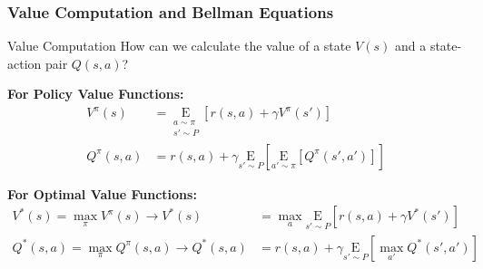 \begin{frame}
  \frametitle{Value Computation and Bellman Equations}

  \begin{block}{Value Computation}
    How can we calculate the value of a state $V(s)$ 
    and a state-action pair $Q(s,a)$?
  \end{block}


  \textbf{For Policy Value Functions:}
  \begin{align*}
      V^{\pi}(s) &= \underset{\substack{a \sim \pi \\ s'\sim P}}{\mathrm{E}} 
      \left[ r(s,a) + \gamma V^{\pi}(s') \right] \\[-.5em]
      Q^{\pi}(s,a) &= r(s,a) + \gamma \underset{s'\sim P}{\mathrm{E}} 
      \left[ \underset{a'\sim \pi}{\mathrm{E}} \left[ Q^{\pi}(s',a') \right] \right]
  \end{align*}


  \textbf{For Optimal Value Functions:}
  \begin{align*}
    V^{*}(s) = \underset{\pi}{\max} V^{\pi}(s) \to
      V^{*}(s) &= \max_a \underset{s'\sim P}{\mathrm{E}} \left[ r(s,a) + \gamma V^{*}(s') \right] \\[-.5em]
      Q^{*}(s,a) = \underset{\pi}{\max} Q^{\pi}(s,a) \to
      Q^{*}(s,a) &= r(s,a) + \gamma \underset{s'\sim P}{\mathrm{E}} \left[ \max_{a'} Q^{*}(s',a') \right]
  \end{align*}

\end{frame}
